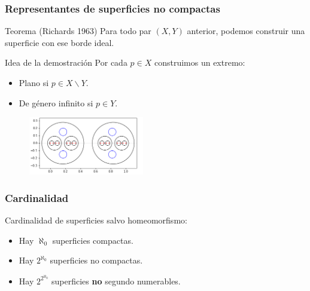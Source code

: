 \documentclass{beamer}
\begin{document}
\begin{frame}
\frametitle{Representantes de superficies no compactas}

\begin{block}
{Teorema (Richards 1963)}
Para todo par $(X,Y)$ anterior, podemos construir una superficie con ese borde ideal.
\end{block}
\begin{block}
{Idea de la demostración}
Por cada $p\in X$ construimos un extremo:
\begin{itemize}
\item Plano si $p\in X\backslash Y$.
\item De género infinito si $p\in Y$. 
\end{itemize}
\begin{figure}[htb]
\begin{center}
\includegraphics[width=2in,height=1in]{imagenes/eleccionCK.png} 
\end{center}
\end{figure}


\end{block}
\end{frame}



\begin{frame}
\frametitle{Cardinalidad}
Cardinalidad de superficies salvo homeomorfismo:
\begin{itemize}
\item Hay $\aleph_0$ superficies compactas.
\item Hay $2^{\aleph_0}$ superficies no compactas.
\item  Hay $2^{2^{\aleph_0}}$ superficies \textbf{no} segundo numerables.
\end{itemize}



\end{frame}

 

 
 
 
 
\end{document}
